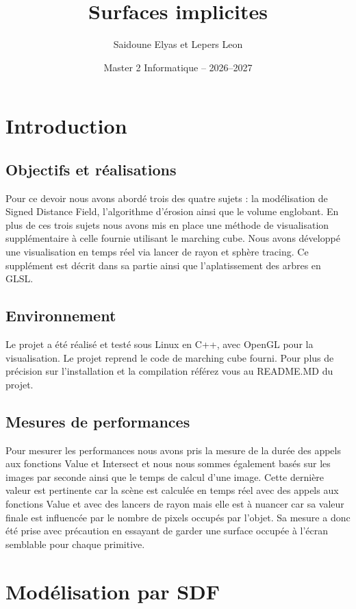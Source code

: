 \documentclass[11pt,a4paper]{article}
\title{
  Surfaces implicites\\
}
\author{Saidoune Elyas et Lepers Leon}
\date{Master 2 Informatique -- 2026--2027}
\begin{document}
\maketitle
\tableofcontents
\clearpage

\section{Introduction}
\subsection{Objectifs et réalisations}
Pour ce devoir nous avons abordé trois des quatre sujets : la modélisation de Signed Distance Field, l'algorithme d'érosion ainsi que le volume englobant. En plus de ces trois sujets nous avons mis en place une méthode de visualisation supplémentaire à celle fournie utilisant le marching cube. Nous avons développé une visualisation en temps réel via lancer de rayon et sphère tracing.
Ce supplément est décrit dans sa partie ainsi que l'aplatissement des arbres en GLSL.

\subsection{Environnement}
Le projet a été réalisé et testé sous Linux en C++, avec OpenGL pour la visualisation. Le projet reprend le code de marching cube fourni. Pour plus de précision sur l'installation et la compilation référez vous au README.MD du projet.

\subsection{Mesures de performances}
Pour mesurer les performances nous avons pris la mesure de la durée des appels aux fonctions Value et Intersect et nous nous sommes également basés sur les images par seconde ainsi que le temps de calcul d'une image.
Cette dernière valeur est pertinente car la scène est calculée en temps réel avec des appels aux fonctions Value et avec des lancers de rayon mais elle est à nuancer car sa valeur finale est influencée par le nombre de pixels occupés par l'objet. Sa mesure a donc été prise avec précaution en essayant de garder une surface occupée à l'écran semblable pour chaque primitive.

\section{Modélisation par SDF}
\end{document}
